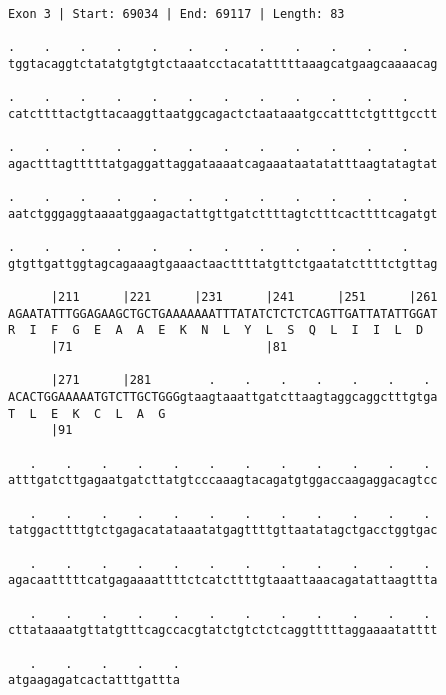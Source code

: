 \documentclass{article}
\begin{document}
\begin{Verbatim}
Exon 3 | Start: 69034 | End: 69117 | Length: 83
 
.    .    .    .    .    .    .    .    .    .    .    .    
tggtacaggtctatatgtgtgtctaaatcctacatatttttaaagcatgaagcaaaacag
  
.    .    .    .    .    .    .    .    .    .    .    .    
catcttttactgttacaaggttaatggcagactctaataaatgccatttctgtttgcctt
  
.    .    .    .    .    .    .    .    .    .    .    .    
agactttagtttttatgaggattaggataaaatcagaaataatatatttaagtatagtat
  
.    .    .    .    .    .    .    .    .    .    .    .    
aatctgggaggtaaaatggaagactattgttgatcttttagtctttcacttttcagatgt
  
.    .    .    .    .    .    .    .    .    .    .    .    
gtgttgattggtagcagaaagtgaaactaacttttatgttctgaatatcttttctgttag
  
      |211      |221      |231      |241      |251      |261
AGAATATTTGGAGAAGCTGCTGAAAAAAATTTATATCTCTCTCAGTTGATTATATTGGAT
R  I  F  G  E  A  A  E  K  N  L  Y  L  S  Q  L  I  I  L  D  
      |71                           |81                     
  
      |271      |281        .    .    .    .    .    .    . 
ACACTGGAAAAATGTCTTGCTGGGgtaagtaaattgatcttaagtaggcaggctttgtga
T  L  E  K  C  L  A  G                                      
      |91                                                   
  
   .    .    .    .    .    .    .    .    .    .    .    . 
atttgatcttgagaatgatcttatgtcccaaagtacagatgtggaccaagaggacagtcc
  
   .    .    .    .    .    .    .    .    .    .    .    . 
tatggacttttgtctgagacatataaatatgagttttgttaatatagctgacctggtgac
  
   .    .    .    .    .    .    .    .    .    .    .    . 
agacaatttttcatgagaaaattttctcatcttttgtaaattaaacagatattaagttta
  
   .    .    .    .    .    .    .    .    .    .    .    . 
cttataaaatgttatgtttcagccacgtatctgtctctcaggtttttaggaaaatatttt
  
   .    .    .    .    .
atgaagagatcactatttgattta
\end{Verbatim}
\newpage
\end{document}
